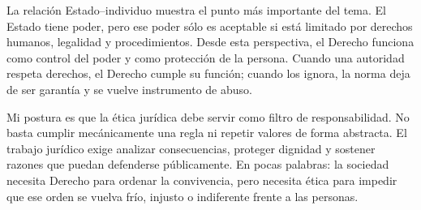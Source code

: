 \documentclass[
	spanish,
	letterpaper, oneside
]{article}
\begin{document}
La relación Estado--individuo muestra el punto más importante del tema. El Estado tiene poder, pero ese poder sólo es aceptable si está limitado por derechos humanos, legalidad y procedimientos. Desde esta perspectiva, el Derecho funciona como control del poder y como protección de la persona. Cuando una autoridad respeta derechos, el Derecho cumple su función; cuando los ignora, la norma deja de ser garantía y se vuelve instrumento de abuso.

Mi postura es que la ética jurídica debe servir como filtro de responsabilidad. No basta cumplir mecánicamente una regla ni repetir valores de forma abstracta. El trabajo jurídico exige analizar consecuencias, proteger dignidad y sostener razones que puedan defenderse públicamente. En pocas palabras: la sociedad necesita Derecho para ordenar la convivencia, pero necesita ética para impedir que ese orden se vuelva frío, injusto o indiferente frente a las personas.


\end{document}
